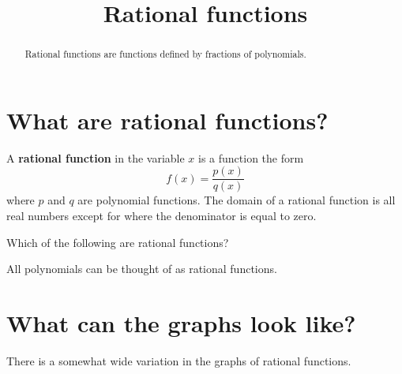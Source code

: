 \documentclass{ximera}
\title[Dig-In:]{Rational functions}
\begin{document}
\begin{abstract}
  Rational functions are functions defined by fractions of
  polynomials.
\end{abstract}
\maketitle


\section{What are rational functions?}

\begin{definition}
  A \textbf{rational function} in the variable $x$ is a function the form
  \[
  f(x) = \frac{p(x)}{q(x)}
  \]
  where $p$ and $q$ are polynomial functions. The domain of a rational
  function is all real numbers except for where the denominator is
  equal to zero.
\end{definition}

\begin{question}
  Which of the following are rational functions?
  \begin{selectAll}
  \end{selectAll}
  \begin{feedback}
    All polynomials can be thought of as rational functions.
  \end{feedback}
\end{question}



\section{What can the graphs look like?}

There is a somewhat wide variation in the graphs of rational
functions.
\end{document}
